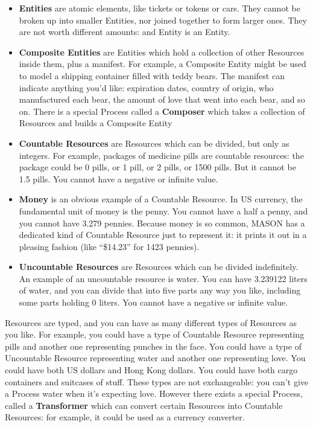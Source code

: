 \documentclass[twoside,10pt]{article}
\begin{document}
\begin{itemize}
\item {\bf Entities} are atomic elements, like tickets or tokens or cars.  They cannot be broken up into smaller Entities, nor joined together to form larger ones.  They are not worth different amounts: and Entity is an Entity.
\item {\bf Composite Entities} are Entities which hold a collection of other Resources inside them, plus a manifest.  For example, a Composite Entity might be used to model a shipping container filled with teddy bears.  The manifest can indicate anything you'd like: expiration dates, country of origin, who manufactured each bear, the amount of love that went into each bear, and so on.  There is a special Process called a {\bf Composer} which takes a collection of Resources and builds a Composite Entity 
\item {\bf Countable Resources} are Resources which can be divided, but only as integers.  For example, packages of medicine pills are countable resources: the package could be 0 pills, or 1 pill, or 2 pills, or 1500 pills.  But it cannot be 1.5 pills.  You cannot have a negative or infinite value.
\item {\bf Money} is an obvious example of a Countable Resource.  In US currency, the fundamental unit of money is the penny.  You cannot have a half a penny, and you cannot have 3.279 pennies.  Because money is so common, MASON has a dedicated kind of Countable Resource just to represent it: it prints it out in a pleasing fashion (like ``\$14.23'' for 1423 pennies). 
\item {\bf Uncountable Resources} are Resources which can be divided indefinitely.  An example of an uncountable resource is water.  You can have 3.239122 liters of water, and you can divide that into five parts any way you like, including some parts holding 0 liters.  You cannot have a negative or infinite value.
\end{itemize}

Resources are typed, and you can have as many different types of Resources as you like.  For example, you could have a type of Countable Resource representing pills and another one representing punches in the face.  You could have a type of Uncountable Resource representing water and another one representing love.  You could have both US dollars and Hong Kong dollars.  You could have both cargo containers and suitcases of stuff.  These types are not exchangeable: you can't give a Process water when it's expecting love.  However there exists a special Process, called a {\bf Transformer} which can convert certain Resources into Countable Resources: for example, it could be used as a currency converter.     
\end{document}

